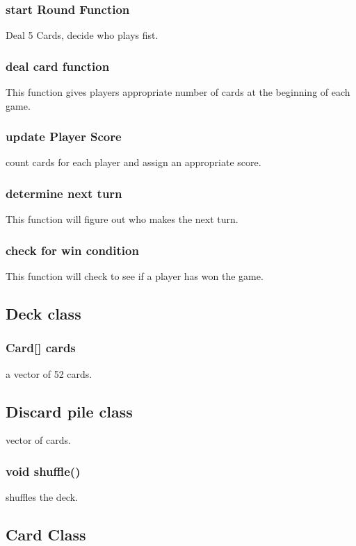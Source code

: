 \subsubsection
    {
      start Round Function
    }
    Deal 5 Cards, decide who plays fist.
    
\subsubsection
    {
      deal card function
    }
    This function gives players appropriate number of cards at the beginning of
      each game.
\subsubsection
    {
      update Player Score
    }
    count cards for each player and assign an appropriate score.
\subsubsection
    {
      determine next turn
    }
    This function will figure out who makes the next turn.
\subsubsection
    {check for win condition
    }
    This function will check to see if a player has won the game.

\subsection
    {
      Deck class
    }

    \subsubsection
    {
      Card[] cards
    }
    a vector of 52 cards.

\subsection
    {
      Discard pile class
    }
    vector of cards.

\subsubsection
    {
      void shuffle()
    }
    shuffles the deck.
    

\subsection
    {
      Card Class
    }

